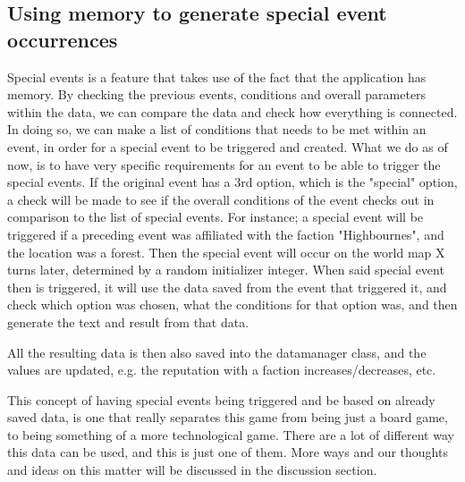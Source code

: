 \subsection{Using memory to generate special event occurrences}

Special events is a feature that takes use of the fact that the application has memory. By checking the previous events, conditions and overall parameters within the data, we can compare the data and check how everything is connected. In doing so, we can make a list of conditions that needs to be met within an event, in order for a special event to be triggered and created. What we do as of now, is to have very specific requirements for an event to be able to trigger the special events. If the original event has a 3rd option, which is the "special" option, a check will be made to see if the overall conditions of the event checks out in comparison to the list of special events.
For instance; a special event will be triggered if a preceding event was affiliated with the faction "Highbournes", and the location was a forest. Then the special event will occur on the world map X turns later, determined by a random initializer integer. When said special event then is triggered, it will use the data saved from the event that triggered it, and check which option was chosen, what the conditions for that option was, and then generate the text and result from that data.

All the resulting data is then also saved into the datamanager class, and the values are updated, e.g. the reputation with a faction increases/decreases, etc.


This concept of having special events being triggered and be based on already saved data, is one that really separates this game from being just a board game, to being something of a more technological game. There are a lot of different way this data can be used, and this is just one of them. More ways and our thoughts and ideas on this matter will be discussed in the discussion section.

